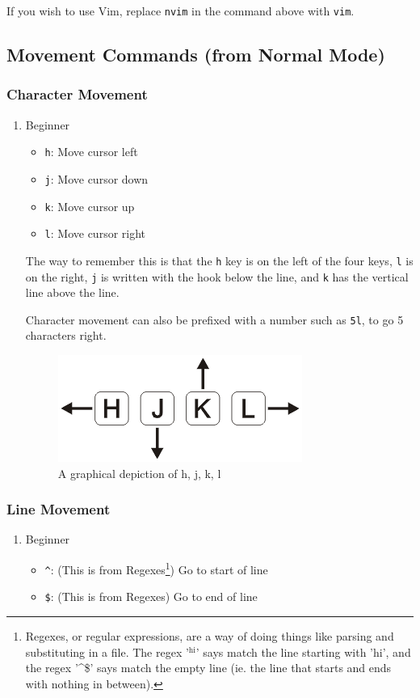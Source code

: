 \documentclass[11pt]{article}
\begin{document}
If you wish to use Vim, replace \texttt{nvim} in the command above with \texttt{vim}.
\subsection{Movement Commands (from Normal Mode)}
\label{sec:org713abb7}
\subsubsection{Character Movement}
\label{sec:org0a7a012}
\begin{enumerate}
\item Beginner
\label{sec:orgc5bf939}
\begin{itemize}
\item \texttt{h}: Move cursor left
\item \texttt{j}: Move cursor down
\item \texttt{k}: Move cursor up
\item \texttt{l}: Move cursor right
\end{itemize}

The way to remember this is that the \texttt{h} key is on the left of the four keys,
\texttt{l} is on the right, \texttt{j} is written with the hook below the line, and \texttt{k} has
the vertical line above the line.

Character movement can also be prefixed with a number such as \texttt{5l}, to go
5 characters right.

\begin{figure}[htbp]
\centering
\includegraphics[width=.9\linewidth]{./hjkl.png}
\caption{\label{fig:org943e4fc}
A graphical depiction of h, j, k, l}
\end{figure}
\end{enumerate}
\subsubsection{Line Movement}
\label{sec:org477ed34}
\begin{enumerate}
\item Beginner
\label{sec:org84e6cd2}
\begin{itemize}
\item \texttt{\textasciicircum{}}: (This is from Regexes\footnote{Regexes, or regular expressions, are a way of doing things like parsing
and substituting in a file. The regex '\(^{\text{hi}}\)' says match the line starting with
'hi', and the regex '\^{}\$' says match the empty line (ie. the line that starts and
ends with nothing in between).}) Go to start of line
\item \texttt{\$}: (This is from Regexes) Go to end of line
\end{itemize}
\end{enumerate}
\end{document}

